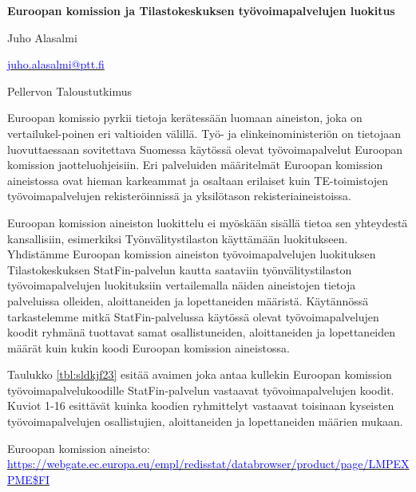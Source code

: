 \documentclass[12pt]{article}
\begin{document}
\noindent \textbf{Euroopan komission ja Tilastokeskuksen työvoimapalvelujen luokitus} \par
\vspace{0.5cm}

\noindent Juho Alasalmi{\par}
\noindent \href{mailto: juho.alasalmi@ptt.fi}{\textcolor{blue}{juho.alasalmi@ptt.fi}}{\par}
\noindent Pellervon Taloustutkimus {\par}

\vspace{0.5cm}

Euroopan komissio pyrkii tietoja kerätessään luomaan aineiston, joka on vertailukel-poinen eri valtioiden välillä. Työ- ja elinkeinoministeriön on tietojaan luovuttaessaan sovitettava Suomessa käytössä olevat työvoimapalvelut Euroopan komission jaotteluohjeisiin. Eri palveluiden määritelmät Euroopan komission aineistossa ovat hieman karkeammat ja osaltaan erilaiset kuin TE-toimistojen työvoimapalvelujen rekisteröinnissä ja yksilötason rekisteriaineistoissa.

Euroopan komission aineiston luokittelu ei myöskään sisällä tietoa sen yhteydestä kansallisiin, esimerkiksi Työnvälitystilaston käyttämään luokitukseen. Yhdistämme Euroopan komission aineiston työvoimapalvelujen luokituksen Tilastokeskuksen StatFin-palvelun kautta saataviin työnvälitystilaston työvoimapalvelujen luokituksiin vertailemalla näiden aineistojen tietoja palveluissa olleiden, aloittaneiden ja lopettaneiden määristä. Käytännössä tarkastelemme mitkä StatFin-palvelussa käytössä olevat työvoimapalvelujen koodit ryhmänä tuottavat samat osallistuneiden, aloittaneiden ja lopettaneiden määrät kuin kukin koodi Euroopan komission aineistossa.

Taulukko \ref{tbl:sldkjf23} esitää avaimen joka antaa kullekin Euroopan komission työvoimapalvelukoodille StatFin-palvelun vastaavat työvoimapalvelujen koodit. Kuviot 1-16 esittävät kuinka koodien ryhmittelyt vastaavat toisinaan kyseisten työvoimapalvelujen osallistujien, aloittaneiden ja lopettaneiden määrien mukaan.

\vspace{1cm}
\noindent Euroopan komission aineisto: \\ \footnotesize \href{https://webgate.ec.europa.eu/empl/redisstat/databrowser/product/page/LMP_EXPME$FI}{\textcolor{blue}{https://webgate.ec.europa.eu/empl/redisstat/databrowser/product/page/LMP\textunderscore EXPME\$FI}} \normalsize
\end{document}
